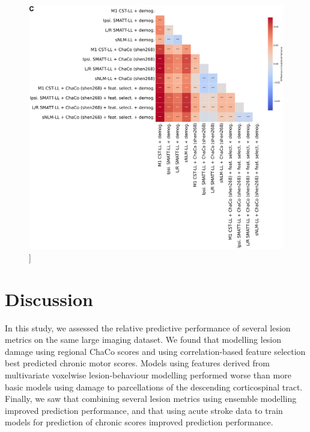 \documentclass[phd,tocprelim]{cornell}
\renewcommand{\caption}[1]{\singlespacing\hangcaption{#1}\normalspacing}
\begin{document}
\null
\vfill
\clearpage
\null
\vfill
\begin{figure}[h!]
		\ContinuedFloat
		\captionsetup{labelformat=adja-page}
    \centering
    \includegraphics[width=1\textwidth]{chapter3/Figure3C.png}
    \caption[]{}
\end{figure}
\null
\vfill
\clearpage


\section{Discussion}
In this study, we assessed the relative predictive performance of several lesion metrics on the same large imaging dataset. We found that modelling lesion damage using regional ChaCo scores and using correlation-based feature selection best predicted chronic motor scores. Models using features derived from multivariate voxelwise lesion-behaviour modelling performed worse than more basic models using damage to parcellations of the descending corticospinal tract. Finally, we saw that combining several lesion metrics using ensemble modelling improved prediction performance, and that using acute stroke data to train models for prediction of chronic scores improved prediction performance. 
\end{document}
